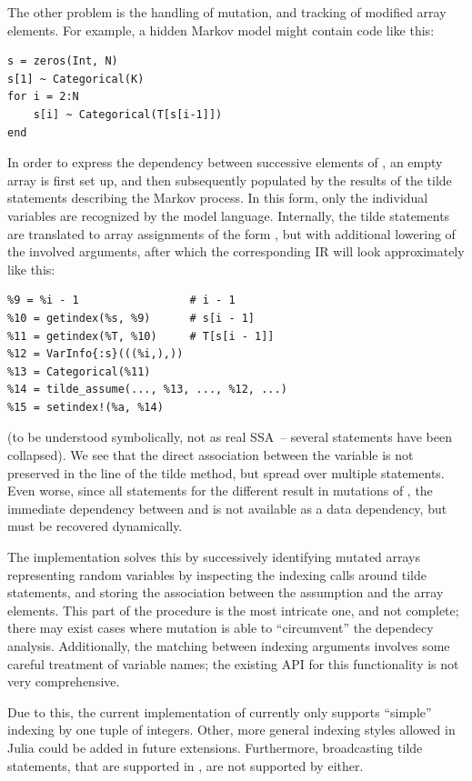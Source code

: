 The other problem is the handling of mutation, and tracking of modified array elements.  For
example, a hidden Markov model might contain code like this:
\begin{lstlisting}
s = zeros(Int, N)
s[1] ~ Categorical(K)
for i = 2:N
    s[i] ~ Categorical(T[s[i-1]])
end
\end{lstlisting}
In order to express the dependency between successive elements of , an empty array is first
set up, and then subsequently populated by the results of the tilde statements describing the Markov
process.  In this form, only the individual variables  are recognized by the model
language.  Internally, the tilde statements are translated to array assignments of the form
, but with additional lowering of the involved arguments, after
which the corresponding IR will look approximately like this:
\begin{lstlisting}
%9 = %i - 1                 # i - 1
%10 = getindex(%s, %9)      # s[i - 1]
%11 = getindex(%T, %10)     # T[s[i - 1]]
%12 = VarInfo{:s}(((%i,),))
%13 = Categorical(%11)
%14 = tilde_assume(..., %13, ..., %12, ...)
%15 = setindex!(%a, %14)
\end{lstlisting}
(to be understood symbolically, not as real SSA~-- several statements have been collapsed).  We see
that the direct association between the variable  is not preserved in the line of the tilde
method, but spread over multiple statements. Even worse, since all statements for the different
 result in mutations of , the immediate dependency between  and
 is not available as a data dependency, but must be recovered dynamically.

The  implementation solves this by successively identifying mutated arrays
representing random variables by inspecting the indexing calls around tilde statements, and storing
the association between the assumption and the array elements.  This part of the procedure is the
most intricate one, and not complete; there may exist cases where mutation is able to
\enquote{circumvent} the dependecy analysis.  Additionally, the matching between indexing arguments
involves some careful treatment of variable names; the existing \dppljl{} API for this functionality
is not very comprehensive.

Due to this, the current implementation of \autogibbsjl{} currently only supports \enquote{simple}
indexing by one tuple of integers.  Other, more general indexing styles allowed in Julia could be
added in future extensions.  Furthermore, broadcasting tilde statements, that are supported in
\dppljl{}, are not supported by \autogibbsjl{} either.

